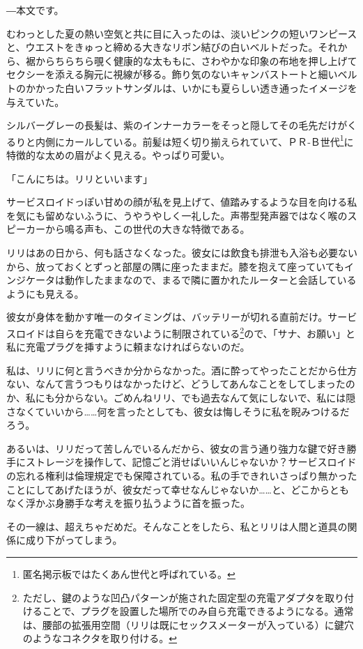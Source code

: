 
\――本文です。

\sectionbreak

むわっとした夏の熱い空気と共に目に入ったのは、淡いピンクの短いワンピースと、ウエストをきゅっと締める大きなリボン結びの白いベルトだった。それから、裾からちらちら覗く健康的な太ももに、さわやかな印象の布地を押し上げてセクシーを添える胸元に視線が移る。飾り気のないキャンバストートと細いベルトのかかった白いフラットサンダルは、いかにも夏らしい透き通ったイメージを与えていた。

シルバーグレーの長髪は、紫のインナーカラーをそっと隠してその毛先だけがくるりと内側にカールしている。前髪は短く切り揃えられていて、ＰＲ‐Ｂ世代\footnote{匿名掲示板ではたくあん世代と呼ばれている。}に特徴的な太めの眉がよく見える。やっぱり可愛い。

「こんにちは。リリといいます」

サービスロイドっぽい甘めの顔が私を見上げて、値踏みするような目を向ける私を気にも留めないふうに、うやうやしく一礼した。声帯型発声器ではなく喉のスピーカーから鳴る声も、この世代の大きな特徴である。

\sectionbreak

リリはあの日から、何も話さなくなった。彼女には飲食も排泄も入浴も必要ないから、放っておくとずっと部屋の隅に座ったままだ。膝を抱えて座っていてもインジケータは動作したままなので、まるで隣に置かれたルーターと会話しているようにも見える。

彼女が身体を動かす唯一のタイミングは、バッテリーが切れる直前だけ。サービスロイドは自らを充電できないように制限されている\footnote{ただし、鍵のような凹凸パターンが施された固定型の充電アダプタを取り付けることで、プラグを設置した場所でのみ自ら充電できるようになる。通常は、腰部の拡張用空間（リリは既にセックスメーターが入っている）に鍵穴のようなコネクタを取り付ける。}ので、「サナ、お願い」と私に充電プラグを挿すように頼まなければらないのだ。

私は、リリに何と言うべきか分からなかった。酒に酔ってやったことだから仕方ない、なんて言うつもりはなかったけど、どうしてあんなことをしてしまったのか、私にも分からない。ごめんねリリ、でも過去なんて気にしないで、私には隠さなくていいから……何を言ったとしても、彼女は悔しそうに私を睨みつけるだろう。

あるいは、リリだって苦しんでいるんだから、彼女の言う通り強力な鍵で好き勝手にストレージを操作して、記憶ごと消せばいいんじゃないか？サービスロイドの忘れる権利は倫理規定でも保障されている。私の手できれいさっぱり無かったことにしてあげたほうが、彼女だって幸せなんじゃないか……と、どこからともなく浮かぶ身勝手な考えを振り払うように首を振った。

その一線は、超えちゃだめだ。そんなことをしたら、私とリリは人間と道具の関係に成り下がってしまう。
